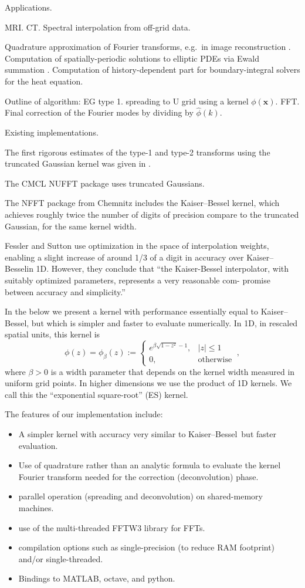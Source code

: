 \documentclass[10pt]{article}
\newcommand{\bi}{\begin{itemize}}
\newcommand{\ei}{\end{itemize}}
\newcommand{\be}{\begin{equation}}
\newcommand{\ee}{\end{equation}}
\newcommand{\mbf}[1]{{\mathbf #1}}
\newcommand{\xx}{\mbf{x}}
\newcommand{\KB}{Kaiser--Bessel}
\newcommand{\wid}{\beta}               %
\begin{document}
Applications.

MRI.
CT.
Spectral interpolation from off-grid data.

Quadrature approximation of Fourier transforms, e.g.\
in image reconstruction \cite{cryo}.
Computation of spatially-periodic solutions to elliptic
PDEs via Ewald summation
\cite{lindbo11}.
Computation of history-dependent part for boundary-integral solvers
for the heat equation.%



Outline of algorithm:
EG type 1.
spreading to U grid using a kernel $\phi(\xx)$.
FFT.
Final correction of the Fourier modes by dividing by
$\hat\phi(k)$.


Existing implementations.

The first rigorous estimates of the type-1 and type-2 transforms
using the truncated Gaussian kernel was given in \cite{dutt}.

The CMCL NUFFT package \cite{cmcl,nufft,nufft3} uses truncated Gaussians.



The NFFT package \cite{nfft} from Chemnitz
includes the Kaiser--Bessel kernel,
which
achieves roughly twice the number of digits of precision
compare to the truncated Gaussian, for the same kernel width.

Fessler and Sutton \cite{fessler} use optimization in the space of
interpolation weights, enabling a slight increase
of around 1/3 of a digit in accuracy
over \KB in 1D. However, they conclude that
``the Kaiser-Bessel interpolator, with suitably
optimized parameters, represents a very reasonable com-
promise between accuracy and simplicity.''

In the below we present a kernel with performance essentially
equal to \KB, but which is simpler and faster to evaluate numerically.
In 1D, in rescaled spatial units, this kernel is
\be
\phi(z) = \phi_\beta(z) :=
\left\{\begin{array}{ll}
e^{\beta \sqrt{1-z^2}-1}, & |z|\le 1\\
0, & \mbox{otherwise}
\end{array}
\right.
~,
\label{ES}
\ee
where $\wid>0$ is a width parameter that depends on the kernel width
measured in uniform grid points.
In higher dimensions we use the product of 1D kernels.
We call this the ``exponential square-root'' (ES) kernel.



The features of our implementation include:
\bi
\item A simpler kernel with accuracy very similar to \KB\ but faster evaluation.
\item Use of quadrature rather than an analytic formula to evaluate the kernel Fourier transform needed for the
  correction (deconvolution) phase.
\item parallel operation (spreading and deconvolution) on shared-memory machines.
  \item use of the multi-threaded FFTW3 library for FFTs.
  \item compilation options such as single-precision (to reduce RAM footprint)
    and/or single-threaded.
  \item Bindings to MATLAB, octave, and python.
\ei
\end{document}
